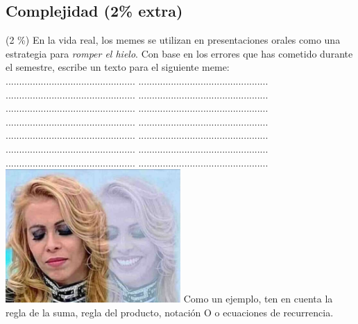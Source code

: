 \documentclass[10 pt]{article}
\begin{document}
\begin{multicols}{2}
\clearpage

\section{Complejidad (2\% extra)}
 (2 \%) En la vida real, los memes se utilizan en presentaciones orales como una estrategia para \textit{romper el hielo}. Con base en los errores que has cometido durante el semestre,
escribe un texto para el siguiente meme:\\
................................................     ................................................\\
................................................     ................................................\\
................................................     ................................................\\
................................................     ................................................\\
................................................     ................................................\\
................................................     ................................................\\
................................................     ................................................\\
\includegraphics[width=0.5\textwidth]{AAHRBRo.jpeg}
Como un ejemplo, ten en cuenta la regla de la suma, regla del producto,
notación O o ecuaciones de recurrencia.


	\end{multicols}
\end{document}
